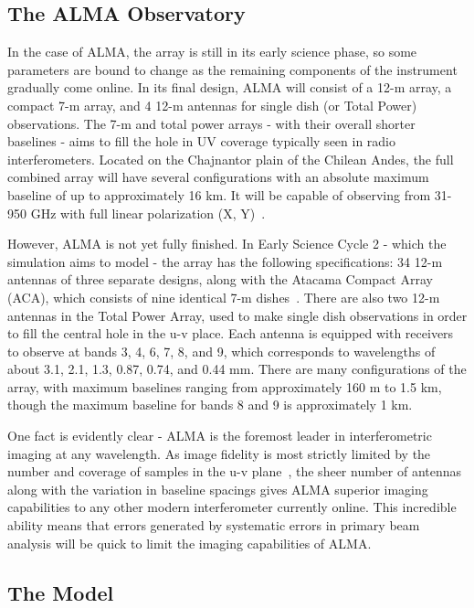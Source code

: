 \documentclass[11pt]{article}
\begin{document}
\subsection{The ALMA Observatory}

In the case of ALMA, the array is still in its early science phase, so some 
parameters are bound to change as the remaining components of the instrument 
gradually come online. In its final design, ALMA will consist of a 12-m array, 
a compact 7-m array, and 4 12-m antennas for single dish (or Total Power) 
observations.  The 7-m and total power arrays - with their overall shorter 
baselines - aims to fill the hole in UV coverage typically seen in radio 
interferometers. Located on the Chajnantor plain of the Chilean Andes, the full 
combined array will have several configurations with an absolute maximum 
baseline of up to approximately 16 km. It will be capable of observing from 
31-950 GHz with full linear polarization (X, Y)~\cite{alma-tech-handbook}.

However, ALMA is not yet fully finished. In Early Science Cycle 
2 - which the simulation aims to model - the array has the following 
specifications: 34 12-m antennas of three separate designs, along with the 
Atacama Compact Array (ACA), which consists of nine identical 7-m 
dishes~\cite{cycle-2-capabilities}. There are also two 12-m antennas in the 
Total Power Array, used to make single dish observations in order to fill the 
central hole in the u-v place. Each antenna is equipped with receivers to 
observe at bands 3, 4, 6, 7, 8, and 9, which corresponds to wavelengths of 
about 3.1, 2.1, 1.3, 0.87, 0.74, and 0.44 mm. There are many configurations of 
the array, with maximum baselines ranging from approximately 160 m to 1.5 km, 
though the maximum baseline for bands 8 and 9 is approximately 1 km.

One fact is evidently clear - ALMA is the foremost leader in interferometric 
imaging at any wavelength. As image fidelity is most strictly limited by the 
number and coverage of samples in the u-v plane~\cite{wright}, the sheer number 
of antennas along with the variation in baseline spacings gives ALMA superior 
imaging capabilities to any other modern interferometer currently online. This 
incredible ability means that errors generated by systematic errors in primary 
beam analysis will be quick to limit the imaging capabilities of ALMA.

\subsection{The Model}
\end{document}
